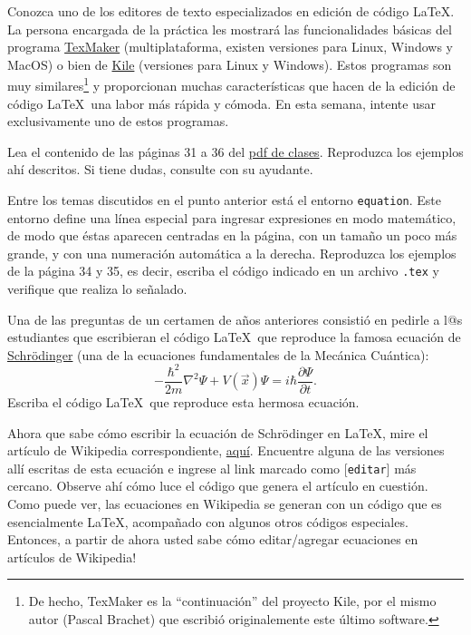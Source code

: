 \documentclass[11pt]{exam}
\begin{document}
\begin{questions}
\item Conozca uno de los editores de texto especializados en edición de código \LaTeX. La persona encargada de la práctica les mostrará las funcionalidades básicas del programa \href{http://www.xm1math.net/texmaker/}{TexMaker} (multiplataforma, existen versiones para Linux, Windows y MacOS) o bien de \href{https://kile.sourceforge.io/}{Kile} (versiones para Linux y Windows). Estos programas son muy similares\footnote{De hecho, TexMaker es la ``continuación'' del proyecto Kile, por el mismo autor (Pascal Brachet) que escribió originalemente este último software.} y proporcionan muchas características que hacen de la edición de código \LaTeX\, una labor más rápida y cómoda. En esta semana, intente usar exclusivamente uno de estos programas.

\item Lea el contenido de las páginas 31 a 36 del \href{https://udec.instructure.com/courses/51022/pages/latex-pdf-presentacion?module_item_id=1904611}{pdf de clases}. Reproduzca los ejemplos ahí descritos. Si tiene dudas, consulte con su ayudante.

\item Entre los temas discutidos en el punto anterior está el entorno \texttt{equation}. Este entorno define una línea especial para ingresar expresiones en modo matemático, de modo que éstas aparecen centradas en la página, con un tamaño un poco más grande, y con una numeración automática a la derecha. Reproduzca los ejemplos de la página 34 y 35, es decir, escriba el código indicado en un archivo \texttt{.tex} y verifique que realiza lo señalado.

\item Una de las preguntas de un certamen de a\~nos anteriores consistió en pedirle a l@s estudiantes que escribieran el código \LaTeX\ que reproduce la famosa ecuación de \href{https://es.wikipedia.org/wiki/Erwin_Schr\%C3\%B6dinger}{Schr\"odinger} (una de la ecuaciones fundamentales de la Mecánica Cuántica):
\begin{equation}
-\frac{\hbar^2}{2m}\nabla^2\Psi+V(\vec{x})\Psi=i\hbar\frac{\partial\Psi}{\partial t}.
\end{equation}
Escriba el código \LaTeX\ que reproduce esta hermosa ecuación.

\item Ahora que sabe cómo escribir la ecuación de Schr\"odinger en \LaTeX, mire el artículo de Wikipedia correspondiente, \href{https://es.wikipedia.org/wiki/Ecuaci\%C3\%B3n_de_Schr\%C3\%B6dinger}{aquí}. Encuentre alguna de las versiones allí escritas de esta ecuación e ingrese al link marcado como [\texttt{editar}] más cercano. Observe ahí cómo luce el código que genera el artículo en cuestión. Como puede ver, las ecuaciones en Wikipedia se generan con un código que es esencialmente \LaTeX, acompa\~nado con algunos otros códigos especiales. Entonces, a partir de ahora usted sabe cómo editar/agregar ecuaciones en artículos de Wikipedia!


\end{questions}
\end{document}
